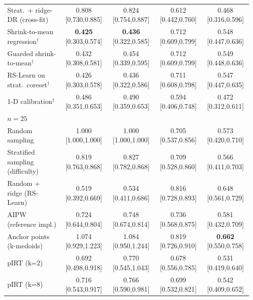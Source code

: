 \begin{tabular}{l cccc}
Strat.\ + ridge-DR (cross-fit) & 0.808 {\scriptsize[0.730,0.885]} & 0.824 {\scriptsize[0.754,0.887]} & 0.612 {\scriptsize[0.442,0.760]} & 0.468 {\scriptsize[0.316,0.596]} \\
Shrink-to-mean regression$^\dagger$ & \textbf{0.425} {\scriptsize[0.303,0.574]} & \textbf{0.436} {\scriptsize[0.322,0.585]} & 0.712 {\scriptsize[0.609,0.799]} & 0.548 {\scriptsize[0.447,0.636]} \\
Guarded shrink-to-mean$^\dagger$ & 0.432 {\scriptsize[0.308,0.581]} & 0.454 {\scriptsize[0.339,0.595]} & 0.712 {\scriptsize[0.609,0.799]} & 0.549 {\scriptsize[0.448,0.636]} \\
RS-Learn on strat.\ coreset$^\dagger$ & 0.426 {\scriptsize[0.303,0.578]} & 0.436 {\scriptsize[0.322,0.586]} & 0.711 {\scriptsize[0.608,0.798]} & 0.547 {\scriptsize[0.447,0.635]} \\
1-D calibration$^\dagger$ & 0.486 {\scriptsize[0.351,0.653]} & 0.490 {\scriptsize[0.359,0.653]} & 0.594 {\scriptsize[0.406,0.748]} & 0.472 {\scriptsize[0.312,0.611]} \\
\midrule
\multicolumn{5}{l}{\emph{$n=25$}}\\
Random sampling & 1.000 {\scriptsize[1.000,1.000]} & 1.000 {\scriptsize[1.000,1.000]} & 0.705 {\scriptsize[0.537,0.856]} & 0.573 {\scriptsize[0.420,0.710]} \\
Stratified sampling (difficulty) & 0.819 {\scriptsize[0.763,0.868]} & 0.827 {\scriptsize[0.782,0.868]} & 0.709 {\scriptsize[0.528,0.860]} & 0.566 {\scriptsize[0.411,0.703]} \\
Random + ridge (RS-Learn) & 0.519 {\scriptsize[0.392,0.669]} & 0.534 {\scriptsize[0.411,0.686]} & 0.816 {\scriptsize[0.728,0.893]} & 0.648 {\scriptsize[0.561,0.729]} \\
AIPW (reference impl.) & 0.724 {\scriptsize[0.644,0.804]} & 0.748 {\scriptsize[0.674,0.814]} & 0.736 {\scriptsize[0.568,0.875]} & 0.581 {\scriptsize[0.432,0.709]} \\
Anchor points (k-medoids) & 1.074 {\scriptsize[0.929,1.223]} & 1.084 {\scriptsize[0.950,1.244]} & 0.819 {\scriptsize[0.726,0.910]} & \textbf{0.662} {\scriptsize[0.550,0.758]} \\
pIRT (k=2) & 0.692 {\scriptsize[0.498,0.918]} & 0.770 {\scriptsize[0.545,1.043]} & 0.678 {\scriptsize[0.556,0.785]} & 0.531 {\scriptsize[0.419,0.640]} \\
pIRT (k=8) & 0.716 {\scriptsize[0.543,0.917]} & 0.766 {\scriptsize[0.590,0.981]} & 0.699 {\scriptsize[0.532,0.821]} & 0.542 {\scriptsize[0.409,0.652]} \\

\end{tabular}
